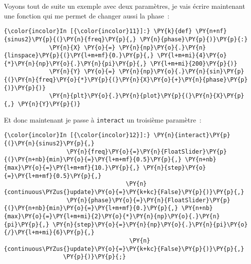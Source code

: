    Voyons tout de suite un exemple avec deux paramètres, je vais écrire
maintenant une fonction qui me permet de changer aussi la phase~:

    \begin{Verbatim}[commandchars=\\\{\},frame=single,framerule=0.3mm,rulecolor=\color{cellframecolor}]
{\color{incolor}In [{\color{incolor}11}]:} \PY{k}{def} \PY{n+nf}{sinus2}\PY{p}{(}\PY{n}{freq}\PY{p}{,} \PY{n}{phase}\PY{p}{)}\PY{p}{:}
             \PY{n}{X} \PY{o}{=} \PY{n}{np}\PY{o}{.}\PY{n}{linspace}\PY{p}{(}\PY{l+m+mf}{0.}\PY{p}{,} \PY{l+m+mi}{4}\PY{o}{*}\PY{n}{np}\PY{o}{.}\PY{n}{pi}\PY{p}{,} \PY{l+m+mi}{200}\PY{p}{)}
             \PY{n}{Y} \PY{o}{=} \PY{n}{np}\PY{o}{.}\PY{n}{sin}\PY{p}{(}\PY{n}{freq}\PY{o}{*}\PY{p}{(}\PY{n}{X}\PY{o}{+}\PY{n}{phase}\PY{p}{)}\PY{p}{)}
             \PY{n}{plt}\PY{o}{.}\PY{n}{plot}\PY{p}{(}\PY{n}{X}\PY{p}{,} \PY{n}{Y}\PY{p}{)}
\end{Verbatim}


    Et donc maintenant je passe à \texttt{interact} un troisième paramètre~:

    \begin{Verbatim}[commandchars=\\\{\},frame=single,framerule=0.3mm,rulecolor=\color{cellframecolor}]
{\color{incolor}In [{\color{incolor}12}]:} \PY{n}{interact}\PY{p}{(}\PY{n}{sinus2}\PY{p}{,}
                  \PY{n}{freq}\PY{o}{=}\PY{n}{FloatSlider}\PY{p}{(}\PY{n+nb}{min}\PY{o}{=}\PY{l+m+mf}{0.5}\PY{p}{,} \PY{n+nb}{max}\PY{o}{=}\PY{l+m+mf}{10.}\PY{p}{,} \PY{n}{step}\PY{o}{=}\PY{l+m+mf}{0.5}\PY{p}{,}
                                   \PY{n}{continuous\PYZus{}update}\PY{o}{=}\PY{k+kc}{False}\PY{p}{)}\PY{p}{,}
                  \PY{n}{phase}\PY{o}{=}\PY{n}{FloatSlider}\PY{p}{(}\PY{n+nb}{min}\PY{o}{=}\PY{l+m+mf}{0.}\PY{p}{,} \PY{n+nb}{max}\PY{o}{=}\PY{l+m+mi}{2}\PY{o}{*}\PY{n}{np}\PY{o}{.}\PY{n}{pi}\PY{p}{,} \PY{n}{step}\PY{o}{=}\PY{n}{np}\PY{o}{.}\PY{n}{pi}\PY{o}{/}\PY{l+m+mi}{6}\PY{p}{,} 
                                    \PY{n}{continuous\PYZus{}update}\PY{o}{=}\PY{k+kc}{False}\PY{p}{)}\PY{p}{,}
                 \PY{p}{)}\PY{p}{;}
\end{Verbatim}


    \begin{center}
    \end{center}
    { \hspace*{\fill} \\}
    
